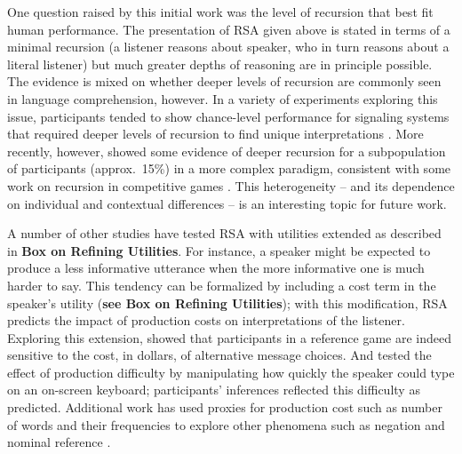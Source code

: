 \documentclass[]{elsarticle}
\begin{document}
One question raised by this initial work was the level of recursion that
best fit human performance. The presentation of RSA given above is
stated in terms of a minimal recursion (a listener reasons about
speaker, who in turn reasons about a literal listener) but much greater
depths of reasoning are in principle possible. The evidence is mixed on whether deeper levels of recursion are commonly seen in language comprehension, however. In a variety of experiments exploring this issue, participants tended to show chance-level performance for signaling systems that required deeper levels of
recursion to find unique interpretations \citep{stiller2011,degen2012,vogel2013}. More recently,
however, \citet{franke2016} showed some evidence of deeper recursion
for a subpopulation of participants (approx.~15\%) in a more
complex paradigm, consistent with some work on recursion in competitive
games \citep{camerer2004}. This heterogeneity -- and its dependence
on individual and contextual differences -- is an interesting topic for
future work.

A number of other studies have tested RSA with utilities extended as
described in \textbf{Box on Refining Utilities}. For instance, a speaker might be expected to
produce a less informative utterance when the more informative one is
much harder to say. This tendency can be formalized by including a cost
term in the speaker's utility (\textbf{see Box on Refining Utilities}); with this modification, RSA
predicts the impact of production costs on interpretations of the
listener. Exploring this extension, \citet{bergen2012} showed that participants in a reference
game are indeed sensitive to the cost, in dollars, of alternative
message choices. And \cite{degen2013} tested the effect of production
difficulty by manipulating how quickly the speaker could type on an
on-screen keyboard; participants' inferences reflected this difficulty
as predicted. Additional work has used proxies for production cost
such as number of words and their frequencies to explore other phenomena such as negation and nominal reference \citep{nordmeyer2014,graf2016}.
\end{document}

